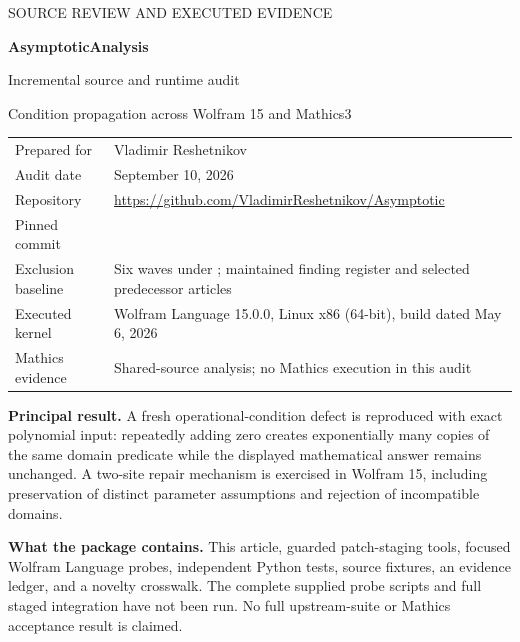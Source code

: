 \documentclass[11pt,a4paper]{article}
\begin{document}
\begin{titlepage}
\vspace*{8mm}
{\large\color{accent} SOURCE REVIEW AND EXECUTED EVIDENCE\par}
\vspace{12mm}
{\Huge\bfseries AsymptoticAnalysis\par}
\vspace{4mm}
{\LARGE Incremental source and runtime audit\par}
\vspace{5mm}
{\Large Condition propagation across Wolfram 15 and Mathics3\par}
\vspace{14mm}
\begin{tabular}{@{}P{35mm}P{118mm}@{}}
Prepared for & Vladimir Reshetnikov\\[1ex]
Audit date & September 10, 2026\\[1ex]
Repository & \url{https://github.com/VladimirReshetnikov/Asymptotic}\\[1ex]
Pinned commit & \\[1ex]
Exclusion baseline & Six waves under ; maintained finding register and selected predecessor articles\\[1ex]
Executed kernel & Wolfram Language 15.0.0, Linux x86 (64-bit), build dated May 6, 2026\\[1ex]
Mathics evidence & Shared-source analysis; no Mathics execution in this audit\\
\end{tabular}
\vfill
\textbf{Principal result.} A fresh operational-condition defect is reproduced with exact polynomial input: repeatedly adding zero creates exponentially many copies of the same domain predicate while the displayed mathematical answer remains unchanged. A two-site repair mechanism is exercised in Wolfram 15, including preservation of distinct parameter assumptions and rejection of incompatible domains.

\textbf{What the package contains.} This article, guarded patch-staging tools, focused Wolfram Language probes, independent Python tests, source fixtures, an evidence ledger, and a novelty crosswalk. The complete supplied probe scripts and full staged integration have not been run. No full upstream-suite or Mathics acceptance result is claimed.
\end{titlepage}
\end{document}
